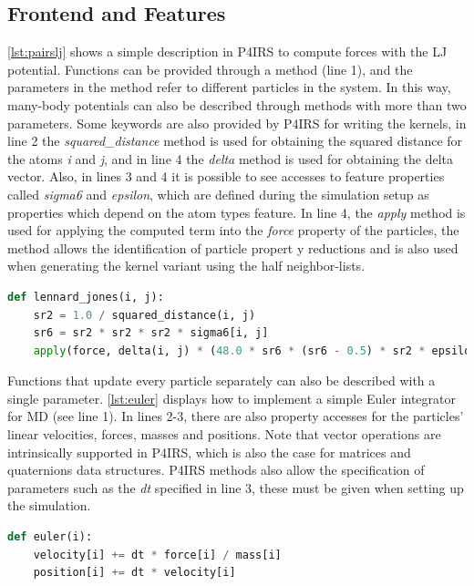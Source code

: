 \documentclass[Afour,sageh,times]{sagej}
\newcommand{\RMchange}[1]{{\color{blue} #1}}
\begin{document}
\subsection{Frontend and Features}
\label{sec:frontend}

\autoref{lst:pairslj} shows a simple description in P4IRS to compute forces with the \ac{LJ} potential.
Functions can be provided through a method (line 1), and the parameters in the method refer to different particles in the system.
In this way, many-body potentials can also be described through methods with more than two parameters.
Some keywords are also provided by P4IRS for writing the kernels, in line 2 the \emph{squared\_distance} method is used for obtaining the squared distance for the atoms \emph{i} and \emph{j}, and in line 4 the \emph{delta} method is used for obtaining the delta vector.
Also, in lines 3 and 4 it is possible to see accesses to feature properties called \emph{sigma6} and \emph{epsilon}, which are defined during the simulation setup as properties which depend on the atom types feature.
In line 4, the \emph{apply} method is used for applying the computed term into the \emph{force} property of the particles, the method allows the identification of particle propert\RMchange{y} reductions and is also used when generating the kernel variant using the half neighbor-lists.

\begin{lstlisting}[language=Python,
		   label={lst:pairslj},
		   caption={Lennard-Jones force description in P4IRS.}]
def lennard_jones(i, j):
    sr2 = 1.0 / squared_distance(i, j)
    sr6 = sr2 * sr2 * sr2 * sigma6[i, j]
    apply(force, delta(i, j) * (48.0 * sr6 * (sr6 - 0.5) * sr2 * epsilon[i, j]))
\end{lstlisting}

Functions that update every particle separately can also be described with a single parameter.
\autoref{lst:euler} displays how to implement a simple Euler integrator for \ac{MD} (see line 1).
In lines 2-3, there are also property accesses for the particles' linear velocities, forces, masses and positions.
Note that vector operations are intrinsically supported in P4IRS, which is also the case for matrices and quaternions data structures.
P4IRS methods also allow the specification of parameters such as the \emph{dt} specified in line 3, these must be given when setting up the simulation.

\begin{lstlisting}[language=Python,
		   label={lst:euler},
		   caption={Euler integrator description in P4IRS.}]
def euler(i):
    velocity[i] += dt * force[i] / mass[i]
    position[i] += dt * velocity[i]
\end{lstlisting}
\end{document}
